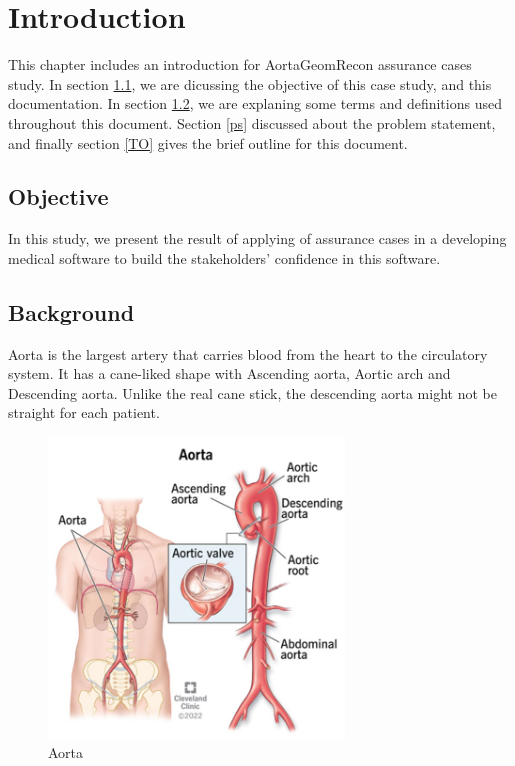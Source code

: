 \chapter{Introduction} \label{intro}
This chapter includes an introduction for AortaGeomRecon assurance cases study. In section \ref{obj}, we are dicussing the objective of this case study, and this documentation. In section \ref{bg}, we are explaning some terms and definitions used throughout this document. Section \ref{ps} discussed about the problem statement, and finally section \ref{TO} gives the brief outline for this document.

%
%

\section{Objective} \label{obj}
In this study, we present the result of applying of assurance cases in a developing medical software to build the stakeholders' confidence in this software.

\section{Background} \label{bg}
Aorta is the largest artery that carries blood from the heart to the circulatory system. It has a cane-liked shape with Ascending aorta, Aortic arch and Descending aorta. Unlike the real cane stick, the descending aorta might not be straight for each patient. 

\begin{figure}[ht]
    \centering
    \includegraphics[width=0.7\textwidth]{figures/Sample/Aorta.png}
    \caption[Aorta]{Aorta}
    \label{fig_aorta}
\end{figure}

